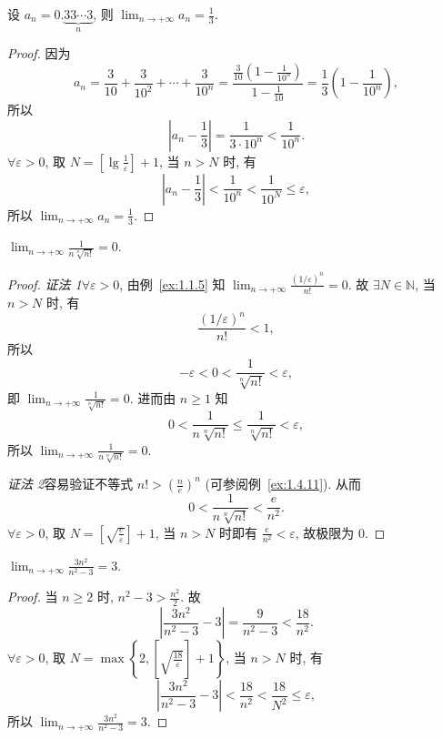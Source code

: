 \begin{example}\label{ex:1.1.8}
设 $a_{n}=0.\underbrace{33\cdots3}_n$, 则 $\lim_{n\to+\infty}a_{n}=\frac{1}{3}$.
\end{example}
\begin{proof}
因为
\[
  a_{n} = \frac{3}{10}+\frac{3}{10^2}+\cdots+\frac{3}{10^n} = \frac{\frac{3}{10}\left(1-\frac{1}{10^n}\right)}{1-\frac{1}{10}} = \frac{1}{3}\left(1-\frac{1}{10^n}\right),
\]
所以
\[
  \left|a_{n}-\frac{1}{3}\right| = \frac{1}{3\cdot 10^n} < \frac{1}{10^n}.
\]
$\forall\varepsilon>0$, 取 $N = \left[\lg\frac{1}{\varepsilon}\right]+1$, 当 $n>N$ 时, 有
\[
  \left|a_{n}-\frac{1}{3}\right| < \frac{1}{10^n} < \frac{1}{10^N} \leqslant \varepsilon,
\]
所以 $\lim_{n\to+\infty}a_{n}=\frac{1}{3}$.
\end{proof}

\begin{example}\label{ex:1.1.9}
$\lim_{n \to +\infty} \frac{1}{n \sqrt[n]{n!}} = 0$.
\end{example}
\begin{proof}
\textit{证法 1}\quad $\forall\varepsilon>0$, 由例~\ref{ex:1.1.5} 知 $\lim_{n\to+\infty}\frac{(1/\varepsilon)^n}{n!}=0$. 故 $\exists N\in\mathbb{N}$, 当 $n>N$ 时, 有
\[
  \frac{(1/\varepsilon)^{n}}{n!}<1,
\]
所以
\[
  -\varepsilon < 0 < \frac{1}{\sqrt[n]{n!}} < \varepsilon,
\]
即 $\lim_{n\to+\infty}\frac{1}{\sqrt[n]{n!}}=0$. 进而由 $n\geqslant 1$ 知
\[
  0 < \frac{1}{n\sqrt[n]{n!}} \leqslant \frac{1}{\sqrt[n]{n!}} < \varepsilon,
\]
所以 $\lim_{n\to+\infty}\frac{1}{n\sqrt[n]{n!}}=0$.

\textit{证法 2}\quad 容易验证不等式 $n! > \left(\frac{n}{e}\right)^n$ (可参阅例~\ref{ex:1.4.11}). 从而
\[
  0 < \frac{1}{n\sqrt[n]{n!}} < \frac{e}{n^2}.
\]
$\forall\varepsilon>0$, 取 $N = \left[\sqrt{\frac{e}{\varepsilon}}\right]+1$, 当 $n>N$ 时即有 $\frac{e}{n^2}<\varepsilon$, 故极限为 0.
\end{proof}

\begin{example}\label{ex:1.1.10}
$\lim_{n\to+\infty}\frac{3n^{2}}{n^{2}-3}=3$.
\end{example}
\begin{proof}
当 $n\geqslant 2$ 时, $n^2-3 > \frac{n^2}{2}$. 故
\[
  \left|\frac{3n^{2}}{n^{2}-3}-3\right| = \frac{9}{n^{2}-3} < \frac{18}{n^{2}}.
\]
$\forall\varepsilon>0$, 取 $N = \max\left\{2, \left[\sqrt{\frac{18}{\varepsilon}}\right]+1\right\}$, 当 $n>N$ 时, 有
\[
  \left|\frac{3n^{2}}{n^{2}-3}-3\right| < \frac{18}{n^2} < \frac{18}{N^2} \leqslant \varepsilon,
\]
所以 $\lim_{n\to+\infty}\frac{3n^{2}}{n^{2}-3}=3$.
\end{proof}

